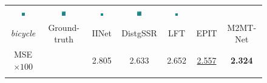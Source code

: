 \begin{figure}[ht!]
{\begin{tabular}{ccccccc}
    \includegraphics[width=0.110\textwidth, height=0.110\textwidth,cfbox=red 1pt 0pt]{img/depth/crop/bicycle/IINet_2.png} &
    \includegraphics[width=0.110\textwidth, height=0.110\textwidth,cfbox=red 1pt 0pt]{img/depth/crop/bicycle/DistgSSR_2.png} &
    \includegraphics[width=0.110\textwidth, height=0.110\textwidth,cfbox=red 1pt 0pt]{img/depth/crop/bicycle/LFT_2.png} &
    \includegraphics[width=0.110\textwidth, height=0.110\textwidth,cfbox=red 1pt 0pt]{img/depth/crop/bicycle/EPIT_2.png} &
    \includegraphics[width=0.110\textwidth, height=0.110\textwidth,cfbox=red 1pt 0pt]{img/depth/crop/bicycle/SATNet_2.png} \\
    
    \textit{bicycle} &
    Ground-truth &
    \small IINet \cite{liuLFIINet_TMM2021} &
    DistgSSR \cite{wangDistgSSR_TIP2022} &
    LFT \cite{liangLFT_SPL2022} &
    EPIT \cite{liangEPIT_arXiv2023} &
    M2MT-Net \\

    MSE$\times100$ &
    &
    2.805 &
    2.633 &
    2.652 &
    \underline{2.557} &
    \textbf{2.324} \\

    \vspace{-5pt} \\


\end{tabular}}
\end{figure}
